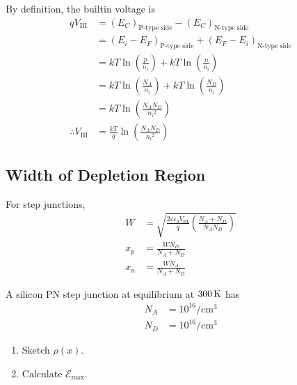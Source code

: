 \documentclass[titlepage, fleqn, a4paper, 12pt, twoside]{article}
\theoremstyle{definition}
\theoremstyle{theorem}
\begin{document}
By definition, the builtin voltage is
\begin{align*}
	q V_{\text{BI}}          & = (E_C)_{\text{P-type side}} - (E_C)_{\text{N-type side}}                       \\
                                 & = (E_i - E_F)_{\text{P-type side}} + (E_F - E_i)_{\text{N-type side}}           \\
                                 & = k T \ln\left( \frac{p}{n_i} \right) + k T \ln\left( \frac{n}{n_i} \right)     \\
                                 & = k T \ln\left( \frac{N_A}{n_i} \right) + k T \ln\left( \frac{N_D}{n_i} \right) \\
                                 & = k T \ln\left( \frac{N_A N_D}{{n_i}^2} \right)                                 \\
	\therefore V_{\text{BI}} & = \frac{k T}{q} \ln\left( \frac{N_A N_D}{{n_i}^2} \right)
\end{align*}

\subsection{Width of Depletion Region}

For step junctions,
\begin{align*}
	W   & = \sqrt{\frac{2 \varepsilon \varepsilon_0 V_{\text{BI}}}{q} \left( \frac{N_A + N_D}{N_A N_D} \right)} \\
	x_p & = \frac{W N_D}{N_A + N_D}                                                                             \\
	x_n & = \frac{W N_A}{N_A + N_D}
\end{align*}

\begin{question}
	A silicon PN step junction at equilibrium at $300 \kelvin$ has
	\begin{align*}
		N_A & = 10^{16} \si{\per\centi\metre\cubed} \\
		N_D & = 10^{16} \si{\per\centi\metre\cubed}
	\end{align*}
	\begin{enumerate}
		\item Sketch $\rho(x)$.
		\item Calculate $\mathcal{E}_{\text{max}}$.
	\end{enumerate}
\end{question}
\end{document}
